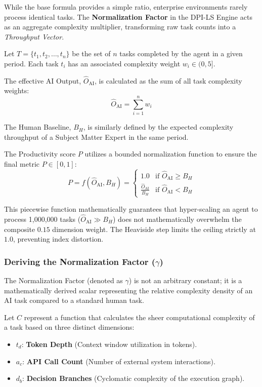 \documentclass[11pt,a4paper]{article}
\begin{document}
While the base formula provides a simple ratio, enterprise environments rarely process identical tasks. The \textbf{Normalization Factor} in the DPI-LS Engine acts as an aggregate complexity multiplier, transforming raw task counts into a \textit{Throughput Vector}.

Let $T = \{t_1, t_2, \dots, t_n\}$ be the set of $n$ tasks completed by the agent in a given period.
Each task $t_i$ has an associated complexity weight $w_i \in (0, 5]$.

The effective AI Output, $\hat{O}_{\text{AI}}$, is calculated as the sum of all task complexity weights:
\[
\hat{O}_{\text{AI}} = \sum_{i=1}^{n} w_i
\]

The Human Baseline, $B_H$, is similarly defined by the expected complexity throughput of a Subject Matter Expert in the same period.

The Productivity score $P$ utilizes a bounded normalization function to ensure the final metric $P \in [0, 1]$:
\[
P = f(\hat{O}_{\text{AI}}, B_H) = \begin{cases} 
      1.0 & \text{if } \hat{O}_{\text{AI}} \geq B_H \\
      \frac{\hat{O}_{\text{AI}}}{B_H} & \text{if } \hat{O}_{\text{AI}} < B_H 
   \end{cases}
\]

This piecewise function mathematically guarantees that hyper-scaling an agent to process 1,000,000 tasks ($ \hat{O}_{\text{AI}} \gg B_H $) does not mathematically overwhelm the composite $0.15$ dimension weight. The Heaviside step limits the ceiling strictly at $1.0$, preventing index distortion.

\subsubsection{Deriving the Normalization Factor ($\gamma$)}

The Normalization Factor (denoted as $\gamma$) is not an arbitrary constant; it is a mathematically derived scalar representing the relative complexity density of an AI task compared to a standard human task.

Let $C$ represent a function that calculates the sheer computational complexity of a task based on three distinct dimensions:
\begin{itemize}
    \item $t_d$: \textbf{Token Depth} (Context window utilization in tokens).
    \item $a_c$: \textbf{API Call Count} (Number of external system interactions).
    \item $d_b$: \textbf{Decision Branches} (Cyclomatic complexity of the execution graph).
\end{itemize}
\end{document}

